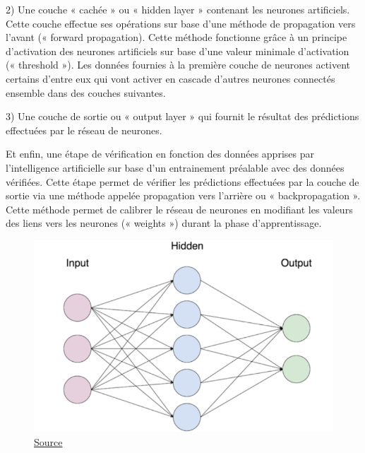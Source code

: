 \documentclass[a4paper,12pt]{article} %
\begin{document}
2)	Une couche « cachée » ou « hidden layer » contenant les neurones artificiels. Cette couche effectue ses opérations sur base d’une méthode de propagation vers l’avant (« forward propagation). Cette méthode fonctionne grâce à un principe d’activation des neurones artificiels sur base d’une valeur minimale d’activation (« threshold »). Les données fournies à la première couche de neurones activent certains d’entre eux qui vont activer en cascade d’autres neurones connectés ensemble dans des couches suivantes.\newline

3)	Une couche de sortie ou « output layer » qui fournit le résultat des prédictions effectuées par le réseau de neurones. \newline

Et enfin, une étape de vérification en fonction des données apprises par l’intelligence artificielle sur base d’un entrainement préalable avec des données vérifiées. Cette étape permet de vérifier les prédictions effectuées par la couche de sortie via une méthode appelée propagation vers l’arrière ou « backpropagation ». Cette méthode permet de calibrer le réseau de neurones en modifiant les valeurs des liens vers les neurones (« weights ») durant la phase d’apprentissage. \newline
\begin{figure}[h] %
  \centering %
  \includegraphics[scale=0.30]{ANN.png} %
  \caption{\href{https://towardsdatascience.com/step-by-step-guide-to-building-your-own-neural-network-from-scratch-df64b1c5ab6e}{Source} }
\end{figure}
\end{document}
